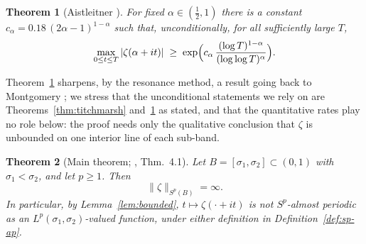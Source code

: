 \documentclass[11pt]{amsart}
\newtheorem{theorem}{Theorem}[section]
\theoremstyle{definition}
\theoremstyle{remark}
\begin{document}
\begin{theorem}[Aistleitner {\cite{Aistleitner}}]\label{thm:aistleitner}
For fixed $\alpha\in(\tfrac12,1)$ there is a constant
$c_\alpha=0.18\,(2\alpha-1)^{1-\alpha}$ such that, unconditionally,
for all sufficiently large $T$,
\[
\max_{0\leq t\leq T}|\zeta(\alpha+it)|
\;\geq\;\exp\Bigl(c_\alpha\,\frac{(\log T)^{1-\alpha}}{(\log\log T)^{\alpha}}\Bigr).
\]
\end{theorem}

Theorem~\ref{thm:aistleitner} sharpens, by the resonance method, a
result going back to Montgomery \cite{Montgomery}; we stress that the
unconditional statements we rely on are
Theorems~\ref{thm:titchmarsh} and~\ref{thm:aistleitner} as stated, and
that the quantitative rates play no role below: the proof needs only
the qualitative conclusion that $\zeta$ is unbounded on one interior
line of each sub-band.

\begin{theorem}[Main theorem; \cite{P30}, Thm.~4.1]\label{thm:main}
Let $B=[\sigma_1,\sigma_2]\subset(0,1)$ with
$\sigma_1<\sigma_2$, and let $p\geq1$. Then
\[
\|\zeta\|_{S^p(B)}=\infty .
\]
In particular, by Lemma~\ref{lem:bounded}, $t\mapsto\zeta(\cdot+it)$
is not $S^p$-almost periodic as an $L^p(\sigma_1,\sigma_2)$-valued
function, under either definition in Definition~\ref{def:sp-ap}.
\end{theorem}
\end{document}
